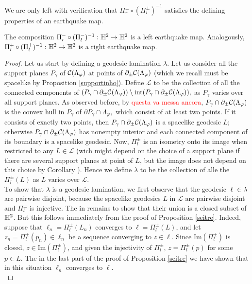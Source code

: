 We are only left with verification that $\Pi_r^\pm\circ(\Pi_l^\pm)^{-1}$ satisfies the defining properties of an earthquake map. 

\begin{proposition}
    The composition $\Pi_r^-\circ(\Pi_l^-)^{-1}:\mathbb{H}^2\to\mathbb{H}^{2}$ is a left earthquake map. Analogously, $\Pi_r^+\circ(\Pi_l^+)^{-1}:\mathbb{H}^2\to\mathbb{H}^2$ is a right earthquake map.
\end{proposition}
\begin{proof}
    Let us start by defining a geodesic lamination $\lambda.$ Let us consider all the support planes $P_\gamma$ of $\mathcal{C}(\Lambda_\varphi)$ at points of $\partial_\pm\mathcal{C}(\Lambda_\varphi)$ (which we recall must be spacelike by Proposition \ref{supportinho}). Define $\mathcal{L}$ to be the collection of all the connected components of $(P_\gamma\cap\partial_\pm\mathcal{C}(\Lambda_\varphi))\setminus\text{int}(P_\gamma\cap\partial_\pm\mathcal{C}(\Lambda_\varphi)),$ as $P_\gamma$ varies over all support planes. As observed before, by \textcolor{red}{questa va messa ancora}, $P_\gamma\cap \partial_\pm\mathcal{C}(\Lambda_\varphi)$ is the convex hull in $P_\gamma$ of $\partial P_\gamma\cap\Lambda_\varphi,$ which consist of at least two points. If it consists of exactly two points, then $P_\gamma\cap \partial_\pm\mathcal{C}(\Lambda_\varphi)$ is a spacelike geodesic $L$; otherwise $P_\gamma\cap\partial_\pm\mathcal{C}(\Lambda_\varphi)$ has nonempty interior and each connected component of its boundary is a spacelike geodesic. Now, $\Pi_l^\pm$ is an isometry onto its image when restricted to any $L\in\mathcal{L}$ (wich might depend on the choice of a support plane if there are several support planes at point of $L$, but the image does not depend on this choice by Corollary ). Hence we define $\lambda$ to be the collection of alle the $\Pi_l^\pm(L)$ as $L$ varies over $\mathcal{L}$. \\
    To show that $\lambda$ is a geodesic lamination, we first observe that the geodesic $\ell\in\lambda$ are pairwise disjoint, because the spacelike geodesics $L$ in $\mathcal{L}$ are pairwise disjoint and $\Pi_l^\pm$ is injective. The in remains to show that their union is a closed subset of $\mathbb{H}^2$. But this follows immediately from the proof of Proposition \ref{seitre}. Indeed, suppose that $\ell_n=\Pi_l^\pm(L_n)$ converges to $\ell=\Pi_l^\pm(L)$, and let $z_n=\Pi_l^\pm(p_n)\in\ell_n$ be a sequence converging to $z\in\ell$. Since $\text{Im}(\Pi_l^\pm)$ is closed, $z\in\text{Im}(\Pi_l^\pm)$, and given the injectivity of $\Pi_l^\pm$, $z=\Pi_l^\pm(p)$ for some $p\in L$. The in the last part of the proof of Proposition \ref{seitre} we have shown that in this situation $\ell_n$ converges to $\ell$. \\

\end{proof}
